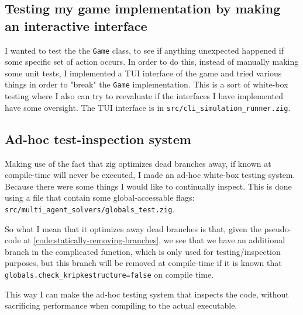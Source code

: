 \subsection{Testing my game implementation by making an interactive interface}
I wanted to test the the {\tt Game} class, to see if anything unexpected happened if some specific set of action occurs. In order to do this, instead of manually making some unit tests, I implemented a TUI interface of the game and tried various things in order to "break" the {\tt Game} implementation. This is a sort of white-box testing where I also can try to reevaluate if the interfaces I have implemented have some oversight. The TUI interface is in {\tt src/cli\_simulation\_runner.zig}.


\subsection{Ad-hoc test-inspection system}
Making use of the fact that zig optimizes dead branches away, if known at compile-time will never be executed, I made an ad-hoc white-box testing system. Because there were some things I would like to continually inspect. This is done using a file that contain some global-accessable flags: {\tt src/multi\_agent\_solvers/globals\_test.zig}.

So what I mean that it optimizes away dead branches is that, given the pseudo-code at \ref{code:statically-removing-branches}, we see that we have an additional branch in the complicated function, which is only used for testing/inspection purposes, but this branch will be removed at compile-time if it is known that {\tt globals.check\_kripkestructure=false} on compile time.

This way I can make the ad-hoc testing system that inspects the code, without sacrificing performance when compiling to the actual executable.

\begin{verbbox}
function some_complicated_function(game, kripkestructure):
    if(globals.check_kripkestructure){
        for each element in kripkestructure{
            print(element)
        }
    }
    // function continues to do other work
}
\end{verbbox}
{\centering
\fbox{\theverbbox}
\par
\label{code:statically-removing-branches}
}

